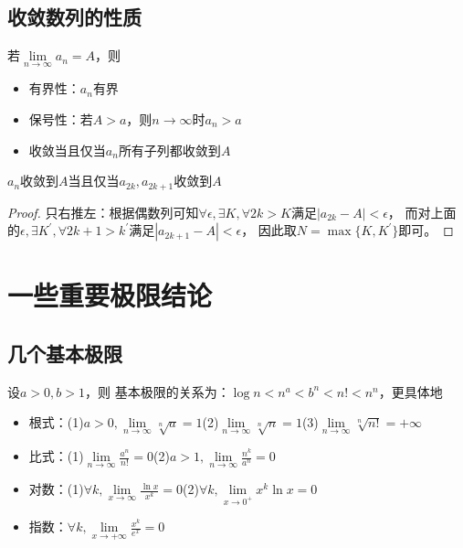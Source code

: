 \subsection{收敛数列的性质}

\begin{theorem}[收敛数列的性质]
  若$\lim \limits _{n \rightarrow \infty} a_n = A$，则
  \begin{itemize}
  \item 有界性：$a_n$有界
  \item 保号性：若$A > a$，则$n \rightarrow \infty$时$a_n > a$
  \item 收敛当且仅当$a_n$所有子列都收敛到$A$
  \end{itemize}
\end{theorem}

\begin{theorem}[奇偶子列收敛]
  $a_n$收敛到$A$当且仅当$a_{2k},a_{2k+1}$收敛到$A$
\end{theorem}

\begin{proof}
  只右推左：根据偶数列可知$\forall \epsilon, \exists K, \forall 2k > K$满足$|a_{2k} - A| < \epsilon$，
  而对上面的$\epsilon, \exists K^{\prime}, \forall 2k+1 > k^{\prime}$满足$|a_{2k+1} - A| < \epsilon$，
  因此取$N = \max\{K,K^{\prime}\}$即可。
\end{proof}

\section{一些重要极限结论}

\subsection{几个基本极限}

\begin{theorem}[常用基本极限]
  设$a > 0, b > 1$，则
  基本极限的关系为：$\log n < n^a < b^n < n! < n^n$，更具体地
  \begin{itemize}
  \item 根式：(1)$a > 0, \lim \limits _{n \rightarrow \infty} \sqrt[n]{a} = 1$(2)$\lim \limits _{n \rightarrow \infty} \sqrt[n]{n} = 1$(3)$\lim \limits _{n \rightarrow \infty} \sqrt[n]{n!} = +\infty$
  \item 比式：(1)$\lim \limits _{n \rightarrow \infty} \frac{a^n}{n!} = 0$(2)$a > 1, \lim \limits _{n \rightarrow \infty} \frac{n^k}{a^n} = 0$
  \item 对数：(1)$\forall k, \lim \limits _{x \rightarrow \infty} \frac{\ln x}{x^k} = 0$(2)$\forall k, \lim \limits _{x \rightarrow 0^+}x^k \ln x = 0$
  \item 指数：$\forall k, \lim \limits _{x \rightarrow +\infty}\frac{x^k}{e^x} = 0$
  \end{itemize}
\end{theorem}

